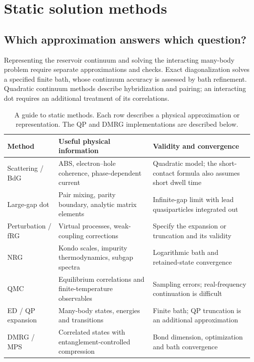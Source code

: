 \chapter{Static solution methods}\label{ch:static}

\section{Which approximation answers which question?}\label{sec:method-landscape}

Representing the reservoir continuum and solving the interacting many-body
problem require separate approximations and checks. Exact diagonalization
solves a specified finite bath, whose continuum accuracy is assessed by bath
refinement. Quadratic continuum methods describe hybridization and pairing;
an interacting dot requires an additional treatment of its correlations.

\begin{table}[htb]
\centering\small
\caption{A guide to static methods. Each row describes a physical approximation
or representation. The QP and DMRG implementations are described below.}
\label{tab:method-landscape}
\begin{tabularx}{\textwidth}{p{}XX}
\toprule
Method & Useful physical information & Validity and convergence \\
\midrule
Scattering / BdG & ABS, electron--hole coherence, phase-dependent current & Quadratic model; the short-contact formula also assumes short dwell time \\
Large-gap dot & Pair mixing, parity boundary, analytic matrix elements & Infinite-gap limit with lead quasiparticles integrated out \\
Perturbation / fRG & Virtual processes, weak-coupling corrections & Specify the expansion or truncation and its validity \\
NRG & Kondo scales, impurity thermodynamics, subgap spectra & Logarithmic bath and retained-state convergence \\
QMC & Equilibrium correlations and finite-temperature observables & Sampling errors; real-frequency continuation is difficult \\
ED / QP expansion & Many-body states, energies and transitions & Finite bath; QP truncation is an additional approximation \\
DMRG / MPS & Correlated states with entanglement-controlled compression & Bond dimension, optimization and bath convergence \\
\bottomrule
\end{tabularx}
\end{table}

